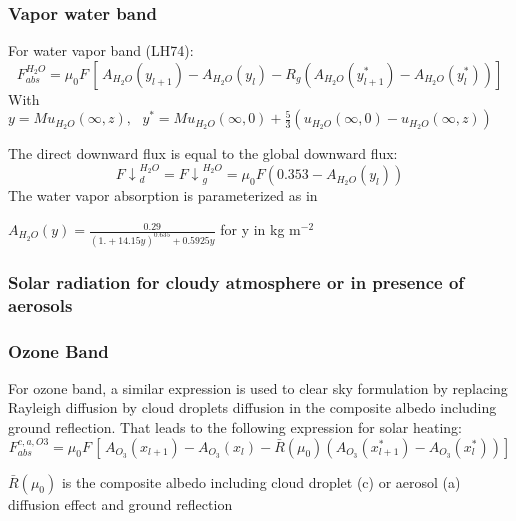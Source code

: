 \subsubsection{Vapor water band}

For water vapor band (LH74):
\begin{equation}
F_{abs}^{H_{2}O}=\mu_{0}F\, [\, A_{H_{2}O}\left( y_{l+1} \right)-A_{H_{2}O}\left(
y_{l} \right)-R_{g}\left( A_{H_{2}O}\left( y_{l+1}^{\ast }
\right)-A_{H_{2}O}\left( y_{l}^{\ast } \right) \right)]
\end{equation}
\newline
With $y=Mu_{H_{2}O}\left( \infty ,z \right),\, \, \, \, y^{\ast
}=Mu_{H_{2}O}\left( \infty ,0 \right)+\frac{5}{3}(u_{H_{2}O}\left( \infty ,0
\right)-u_{H_{2}O}\left( \infty ,z \right))$

The direct downward flux is equal to the global downward flux:
\begin{equation}
{F\downarrow }_{d}^{H_{2}O}={F\downarrow }_{g}^{H_{2}O}=\mu_{0}F\left(
0.353-A_{H_{2}O}\left( y_{l} \right) \right)
\end{equation}
The water vapor absorption is parameterized as in \cite{Yamamoto:1962}

$A_{H_{2}O}\left( y \right)=\frac{0.29}{{(1.+14.15y)}^{0.635}+0.5925y}$ for y in
kg m$^{-2}$

\subsubsection{Solar radiation for cloudy atmosphere or in presence of aerosols}
\subsubsection{Ozone Band}

For ozone band, a similar expression is used to clear sky formulation by
replacing Rayleigh diffusion by cloud droplets diffusion in the composite
albedo including ground reflection. That leads to the following expression
for solar heating:
\begin{equation}
F_{abs}^{c,a,O3}=\mu_{0}F\, [\, A_{O_{3}}\left( x_{l+1} \right)-A_{O_{3}}\left(
x_{l} \right)-\bar{R}(\mu_{0})\left( A_{O_{3}}\left( x_{l+1}^{\ast }
\right)-A_{O_{3}}\left( x_{l}^{\ast } \right) \right)]
\end{equation}

$\bar{R}(\mu_{0})$ is the composite albedo including cloud droplet (c) or
aerosol (a) diffusion effect and ground reflection

